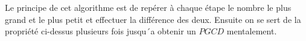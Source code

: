 
Le principe de cet algorithme est de repérer à chaque étape le nombre le plus grand et le plus petit et effectuer la différence des deux. Ensuite on se sert de la propriété ci-dessus plusieurs fois jusqu´a obtenir un $PGCD$ mentalement.
